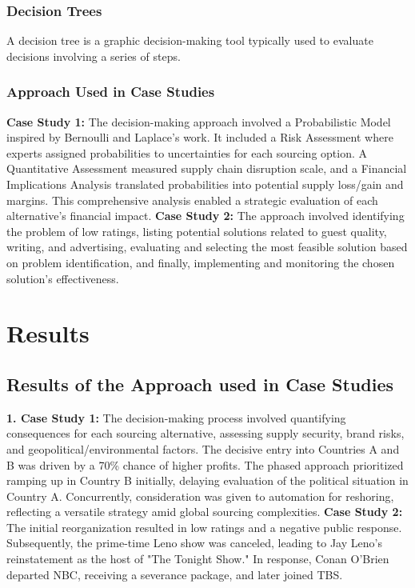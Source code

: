 \documentclass{article}
\begin{document}
\subsubsection{Decision Trees}
A decision tree is a graphic decision-making tool typically used to evaluate decisions involving a series of steps.

\subsubsection{Approach Used in Case Studies}

\textbf{Case Study 1:}
The decision-making approach involved a Probabilistic Model inspired by Bernoulli and Laplace's work. It included a Risk Assessment where experts assigned probabilities to uncertainties for each sourcing option. A Quantitative Assessment measured supply chain disruption scale, and a Financial Implications Analysis translated probabilities into potential supply loss/gain and margins. This comprehensive analysis enabled a strategic evaluation of each alternative's financial impact.
\newline\newline
\textbf{Case Study 2:}
The approach involved identifying the problem of low ratings, listing potential solutions related to guest quality, writing, and advertising, evaluating and selecting the most feasible solution based on problem identification, and finally, implementing and monitoring the chosen solution's effectiveness.


\section{Results}
\subsection{Results of the Approach used in Case Studies}
\textbf{1. Case Study 1:} The decision-making process involved quantifying consequences for each sourcing alternative, assessing supply security, brand risks, and geopolitical/environmental factors. The decisive entry into Countries A and B was driven by a 70\% chance of higher profits. The phased approach prioritized ramping up in Country B initially, delaying evaluation of the political situation in Country A. Concurrently, consideration was given to automation for reshoring, reflecting a versatile strategy amid global sourcing complexities.
\newline
\newline
\textbf{Case Study 2:} The initial reorganization resulted in low ratings and a negative public response. Subsequently, the prime-time Leno show was canceled, leading to Jay Leno's reinstatement as the host of "The Tonight Show." In response, Conan O'Brien departed NBC, receiving a severance package, and later joined TBS.
\end{document}
